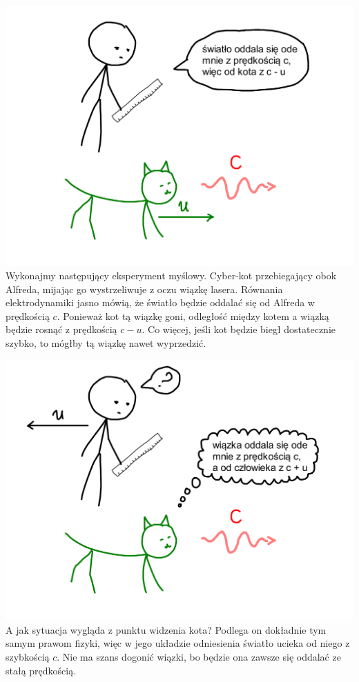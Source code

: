 \documentclass[10pt,twocolumn,fleqn,polish]{article}
\begin{document}
\noindent\includegraphics[width=1\linewidth]{pages/STA-page14}
Wykonajmy następujący eksperyment myślowy. Cyber-kot przebiegający obok
Alfreda, mijając go wystrzeliwuje z oczu wiązkę lasera.
Równania elektrodynamiki jasno mówią, że światło będzie oddalać się od
Alfreda w prędkością $c$. Ponieważ kot tą wiązkę goni, odległość między
kotem a wiązką będzie rosnąć z prędkością $c - u$. Co więcej, jeśli kot
będzie biegł dostatecznie szybko, to mógłby tą wiązkę nawet wyprzedzić.
\newpage

\noindent\includegraphics[width=1\linewidth]{pages/STA-page15}
A jak sytuacja wygląda z punktu widzenia kota? Podlega on dokładnie tym samym
prawom fizyki, więc w jego układzie odniesienia światło ucieka
od niego z szybkością $c$. Nie ma szans dogonić wiązki, bo będzie ona
zawsze się oddalać ze stałą prędkością.
\end{document}
